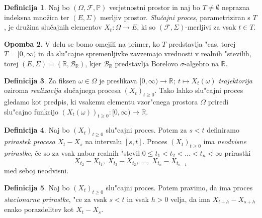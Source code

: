 \documentclass[12pt, a4paper, reqno]{amsart}
\theoremstyle{definition}
\newtheorem{definicija}{Definicija}[section]
\newtheorem{opomba}[definicija]{Opomba}
\theoremstyle{plain}
\newcommand{\R}{\mathbb{R}}
\newcommand{\B}{\mathcal{B}}
\newcommand{\1}{\mathds{1}}
\begin{document}
    \begin{definicija}
        Naj bo $(\Omega, \mathcal{F}, \mathbb{P})$ verjetnostni prostor in naj bo $T\neq\emptyset$
        neprazna indeksna množica ter $(E, \Sigma)$ merljiv prostor. \textit{Slučajni proces}, 
        parametriziran s $T$, je družina slučajnih elementov $X_t : \Omega \to E$,
         ki so $(\mathcal{F}, \Sigma)$-merljivi za vsak $t \in T$.
        \label{def:slucProc}
    \end{definicija}

    \begin{opomba}
        V delu se bomo omejili na primer, ko $T$ predstavlja "cas, torej $T = [0, \infty)$ in da slu"cajne
        spremenljivke 
        zavzemajo vrednosti v realnih "stevilih, torej $(E, \Sigma) = (\R, \B_{\R})$, kjer $\B_\R$ 
        predstavlja Borelovo $\sigma$-algebro na $\R$.
        \label{op:Konvencije}
    \end{opomba}


    \begin{definicija}
        Za fiksen $\omega \in \Omega$ je preslikava 
        $[0, \infty) \rightarrow \mathbb{R}; \ t \mapsto X_t(\omega)$ 
        \textit{trajektorija} oziroma \textit{realizacija} slučajnega procesa $(X_t)_{t\geq0}$.
        Tako lahko slu"cajni proces gledamo kot predpis, ki vsakemu elementu vzor"cnega prostora 
        $\Omega$ priredi slu"cajno funkcijo
        $(X_t(\omega))_{t\geq0}: [0, \infty) \rightarrow \mathbb{R}$.
        \label{def:realizac}
    \end{definicija}

    \begin{definicija}
        Naj bo $(X_t)_{t\geq0}$ slu"cajni proces. Potem za $s < t$ definiramo
        \textit{prirastek procesa} $X_t - X_s$ na intervalu $[s, t]$. Proces $(X_t)_{t\geq0}$ ima 
        \textit{neodvisne prirastke}, če so za vsak nabor realnih "stevil
        $0 \leq t_1 < t_2 < \ldots < t_n < \infty$ prirastki
        $$
            X_{t_2} - X_{t_1}, \ X_{t_3} - X_{t_2}, \ \ldots, \ X_{t_n} - X_{t_{n-1}}
        $$
        med seboj neodvisni.
        \label{def:prirastek}
    \end{definicija}

    \begin{definicija}
        Naj bo $(X_t)_{t\geq0}$ slu"cajni proces. Potem pravimo, da ima proces
        \textit{stacionarne prirastke}, "ce za vsak $s < t$ in vsak $h > 0$ velja, 
        da ima $X_{t+h} - X_{s+h}$ enako porazdelitev kot $X_t - X_s$.
        \label{def:stacPrir}
    \end{definicija}
\end{document}
